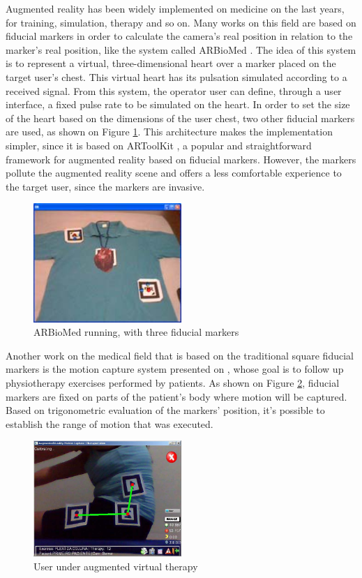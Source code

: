 \documentclass[msc, a4paper, classic, en]{ufbathesis}
\begin{document}
Augmented reality has been widely implemented on medicine on the last years, for training, simulation, therapy and so on. Many works on this field are based on fiducial markers in order to calculate the camera's real position in relation to the marker's real position, like the system called ARBioMed \cite{arbiomed}. The idea of this system is to represent a virtual, three-dimensional heart over a marker placed on the target user's chest. This virtual heart has its pulsation simulated according to a received signal. From this system, the operator user can define, through a user interface, a fixed pulse rate to be simulated on the heart. In order to set the size of the heart based on the dimensions of the user chest, two other fiducial markers are used, as shown on Figure \ref{fig:arbiomed}. This architecture makes the implementation simpler, since it is based on ARToolKit \cite{artoolkit}, a popular and straightforward framework for augmented reality based on fiducial markers. However, the markers pollute the augmented reality scene and offers a less comfortable experience to the target user, since the markers are invasive.

\begin{figure}
\centering
\includegraphics[width=0.5\textwidth]{images/arbiomed.png}
\caption{ARBioMed running, with three fiducial markers \cite{arbiomed}}
\label{fig:arbiomed}
\end{figure}

Another work on the medical field that is based on the traditional square fiducial markers is the motion capture system presented on \cite{fisio}, whose goal is to follow up physiotherapy exercises performed by patients. As shown on Figure \ref{fig:fisio}, fiducial markers are fixed on parts of the patient's body where motion will be captured. Based on trigonometric evaluation of the markers' position, it's possible to establish the range of motion that was executed.

\begin{figure}
\centering
\includegraphics[width=0.5\textwidth]{images/fisio.png}
\caption{User under augmented virtual therapy \cite{fisio}}
\label{fig:fisio}
\end{figure}
\end{document}
